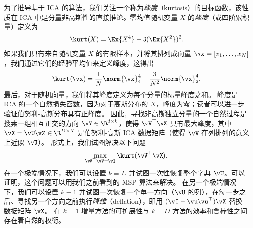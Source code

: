 \documentclass[../../book-main_zh.tex]{subfiles}
\begin{document}
为了推导基于 ICA 的算法，我们关注一个称为\textit{峰度}（kurtosis）的目标函数，该性质在 ICA 中是分量非高斯性的直接推论。零均值随机变量 $X$ 的\textit{峰度}（或四阶累积量）定义为
\begin{equation}\label{eq:kurtosis}
    \kurt(X) = \Ex{X^4} - 3 (\Ex{X^2})^2.
\end{equation}
如果我们只有来自随机变量 $X$ 的有限样本，并将其排列成向量 $\vx = [x_1, \dots, x_N]$，我们通过它们的经验平均值来定义峰度，这得出
\begin{equation}\label{eq:kurtosis-vector}
    \kurt(\vx) = \frac{1}{N} \norm{\vx}_4^4 - \frac{3}{N^2} \norm{\vx}_2^4.
\end{equation}
最后，对于随机向量，我们将其峰度定义为每个分量的标量峰度之和。
峰度是 ICA 的一个自然损失函数，因为对于高斯分布的 $X$，峰度为零；读者可以进一步验证伯努利-高斯分布具有正峰度。
因此，寻找非高斯独立分量的一个自然过程是搜索一组相互正交的方向 $\vV \in \R^{d \times k}$，使得
$\vV^\top \vX$ 具有最大峰度，其中 $\vX = \vU \vZ \in \R^{D \times N}$ 是伯努利-高斯
ICA 数据矩阵（使得 $\vV$ 在列排列的意义上近似 $\vU$）。
形式上，我们试图解决以下问题
\begin{equation}
    \max_{\vV^\top \vV = \vI} \kurt(\vV^\top \vX).
\end{equation}
在一个极端情况下，我们可以设置 $k = D$ 并试图一次性恢复整个字典 $\vU$。可以证明，这个问题可以用我们之前看到的 MSP 算法来解决。
在另一个极端情况下，我们可以设置 $k=1$ 并试图一次恢复一个单一方向（$\vU$
的列），在每一步之后、寻找另一个方向之前执行\textit{降维}（deflation），即用 $(\vI - \vu\vu^\top)
\vX$ 替换数据矩阵 $\vX$。
在 $k=1$ 增量方法的可扩展性与 $k=D$ 方法的效率和鲁棒性之间存在着自然的权衡。
\end{document}
